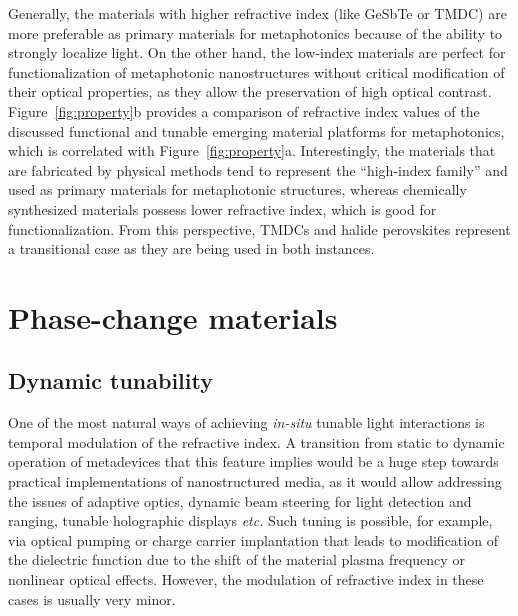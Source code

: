 \documentclass[journal=chreay,manuscript=review]{achemso}
\begin{document}
Generally, the materials with higher refractive index (like GeSbTe or TMDC) are more preferable as primary materials for metaphotonics because of the ability to strongly localize light. On the other hand, the low-index materials are perfect for functionalization of metaphotonic nanostructures without critical modification of their optical properties, as they allow the preservation of high optical contrast. 
Figure~\ref{fig:property}b provides a comparison of refractive index values of the discussed functional and tunable emerging material platforms for metaphotonics, which is correlated with Figure~\ref{fig:property}a. Interestingly, the materials that are fabricated by physical methods tend to represent the ``high-index family'' and used as primary materials for metaphotonic structures, whereas chemically synthesized materials  possess lower refractive index, which is good for functionalization.  From this perspective, TMDCs and halide perovskites represent a transitional case as they are being used in both instances.


\section{Phase-change materials}

\subsection{Dynamic tunability}

One of the most natural ways of achieving \textit{in-situ} tunable light interactions is temporal modulation of the refractive index. A transition from static to dynamic operation of metadevices that this feature implies would be a huge step towards practical implementations of nanostructured media, as it would allow addressing the issues of adaptive optics, dynamic beam steering for light detection and ranging, tunable holographic displays \textit{etc.} Such tuning is possible, for example, via optical pumping or charge carrier implantation \cite{makarov2015tuning, huang2016gate} that leads to modification of the dielectric function due to the shift of the material plasma frequency or nonlinear optical effects. However, the modulation of refractive index in these cases is usually very minor.
\end{document}

